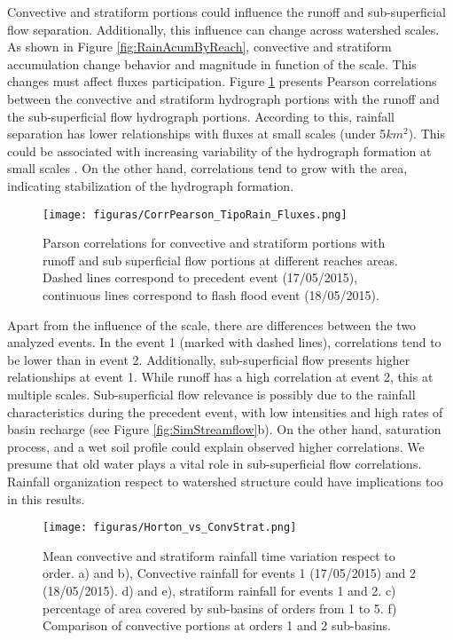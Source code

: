 {Convective and stratiform portions could influence the runoff and sub-superficial flow separation.  Additionally, this influence can change across watershed scales.  As shown in Figure \ref{fig:RainAcumByReach}, convective and stratiform accumulation change behavior and magnitude in function of the scale.   This changes must affect fluxes participation.  Figure \ref{fig:PearsonCorr} presents Pearson correlations between the convective and stratiform hydrograph portions with the runoff and the sub-superficial flow hydrograph portions. According to this, rainfall separation has lower relationships with fluxes at small scales (under 5$km^2$).  This could be associated with increasing variability of the hydrograph formation at small scales \citep{Ayalew2014}.  On the other hand, correlations tend to grow with the area, indicating stabilization of the hydrograph formation.\\ 
    
\begin{figure}[t]
\centering
 \texttt{[image: figuras/CorrPearson\_TipoRain\_Fluxes.png]}
 \caption{Parson correlations for convective and stratiform portions with runoff and sub superficial flow portions at different reaches areas. Dashed lines correspond to precedent event (17/05/2015), continuous lines correspond to flash flood event (18/05/2015).}
    \label{fig:PearsonCorr}
\end{figure}

Apart from the influence of the scale, there are differences between the two analyzed events. In the event 1 (marked with dashed lines), correlations tend to be lower than in event 2.  Additionally, sub-superficial flow presents higher relationships at event 1. While runoff has a high correlation at event 2, this at multiple scales.  Sub-superficial flow relevance is possibly due to the rainfall characteristics during the precedent event, with low intensities and high rates of basin recharge (see Figure \ref{fig:SimStreamflow}b).  On the other hand, saturation process, and a wet soil profile could explain observed higher correlations.  We presume that old water plays a vital role in sub-superficial flow correlations.  Rainfall organization respect to watershed structure could have implications too in this results.\\   

\begin{figure}[t!]
\centering
 \texttt{[image: figuras/Horton\_vs\_ConvStrat.png]}
 \caption{Mean convective and stratiform rainfall time variation respect to order.  a) and b),  Convective rainfall for events 1 (17/05/2015) and 2 (18/05/2015). d) and e), stratiform rainfall for events 1 and 2. c) percentage of area covered by sub-basins of orders from 1 to 5. f) Comparison of convective portions at orders 1 and 2 sub-basins.}
    \label{fig:HortonVSConvStra}
\end{figure}

}
